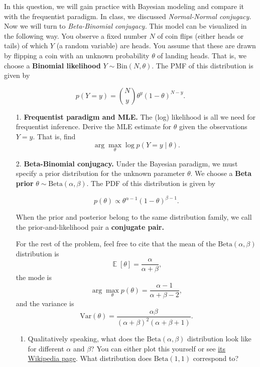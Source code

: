 \documentclass[submit]{../harvardml}
\DeclareMathOperator*{\mean}{\mathbb{E}}
\begin{document}
\begin{problem}

In this question, we will gain practice with Bayesian modeling and
compare it with the frequentist paradigm.
In class, we discussed \emph{Normal-Normal conjugacy.} Now
we will turn to \emph{Beta-Binomial conjugacy.} This model can be
visualized in the following way.
You observe a fixed number \(N\) of coin flips (either
heads or tails) of which \(Y\) (a random variable) are heads. You assume that these are
drawn by flipping a coin with an unknown probability \(\theta\) of
landing heads. That is, we choose a \textbf{Binomial likelihood}
\(Y \sim \mathrm{Bin}(N, \theta)\). The PMF of this distribution is
given by

\[
  p(Y=y) = {N \choose y} \theta^{y} (1-\theta)^{N-y}.
\]

\begin{enumerate}
  \item[1.]
    \textbf{Frequentist paradigm and MLE.} The (log) likelihood is all we
    need for frequentist inference. Derive the MLE estimate for \(\theta\)
    given the observations \(Y = y\). That is, find
    \[\arg \max_{\theta} \log p(Y = y \mid \theta).\]

  \item[2.]
    \textbf{Beta-Binomial conjugacy.} Under the Bayesian paradigm, we must specify a
    prior distribution for the unknown parameter \(\theta\). We choose a \textbf{Beta prior}
    \(\theta \sim \mathrm{Beta}(\alpha, \beta)\). The PDF of this
    distribution is given by

    \[
      p(\theta) \propto \theta^{\alpha - 1} (1-\theta)^{\beta - 1}.
    \]

    When the prior and posterior belong to the same distribution family, we
    call the prior-and-likelihood pair a \textbf{conjugate pair.}

    For the rest of the problem, feel free to cite that the mean of the \(\mathrm{Beta}(\alpha, \beta)\) distribution is
    \[\mean[\theta] = \frac{\alpha}{\alpha+\beta},\]
    the mode is
    \[\arg\max_\theta p(\theta) = \frac{\alpha-1}{\alpha+\beta-2},\]
    and the variance is
    \[
      \mathrm{Var}(\theta) = \frac{\alpha \beta}{(\alpha + \beta)^2 (\alpha + \beta + 1)}.
    \]

    \begin{enumerate}
      \item
            Qualitatively speaking, what does the $\mathrm{Beta}(\alpha, \beta)$ distribution look like for different $\alpha$ and $\beta$? You can either plot this yourself or see \href{https://en.wikipedia.org/wiki/Beta_distribution}{its Wikipedia page}. What distribution does $\mathrm{Beta}(1, 1)$ correspond to?


\end{enumerate}
\end{enumerate}
\end{problem}
\end{document}
